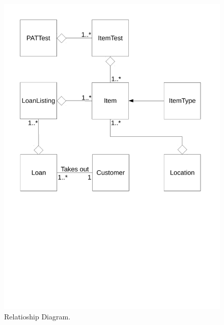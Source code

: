 \begin{figure}[H]
    \includegraphics[width=\textwidth]{./Analysis/Relationship_Diagrams/Relationships_diagrams.pdf}
    \caption{Relatioship Diagram.} \label{fig:relationship_diadram}
\end{figure}

\newpage


